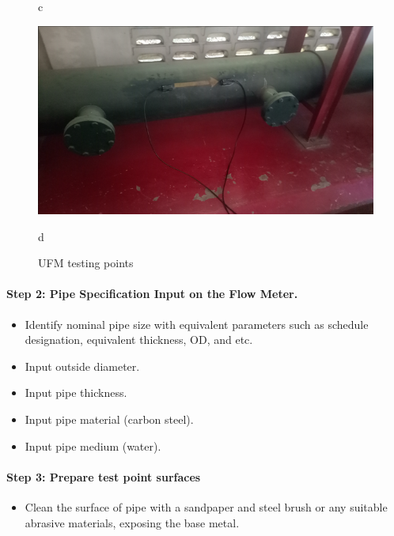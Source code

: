 \begin{figure}[ht]
\begin{minipage}[b]{0.225\linewidth}
		\caption*{c}
	\end{minipage}
	\hspace{0.05cm}
	\begin{minipage}[b]{0.225\linewidth}
		\centering
		\includegraphics[width=\textwidth]{figures/fig_ch02_ufm2}
		\caption*{d}
	\end{minipage}
	\caption{UFM testing points}
	\label{fig_ch02_ufm}	
\end{figure}


\paragraph{Step 2: Pipe Specification Input on the Flow Meter.}
\begin{itemize}
\item Identify nominal pipe size with equivalent parameters such as schedule designation, equivalent thickness, OD, and etc.
\item Input outside diameter.
\item Input pipe thickness.
\item Input pipe material (carbon steel).
\item Input pipe medium (water).

\end{itemize}

\paragraph{Step 3: Prepare test point surfaces}
\begin{itemize}
	\item Clean the surface of pipe with a sandpaper and steel brush or any suitable abrasive materials, exposing the base metal.
	
\end{itemize}

